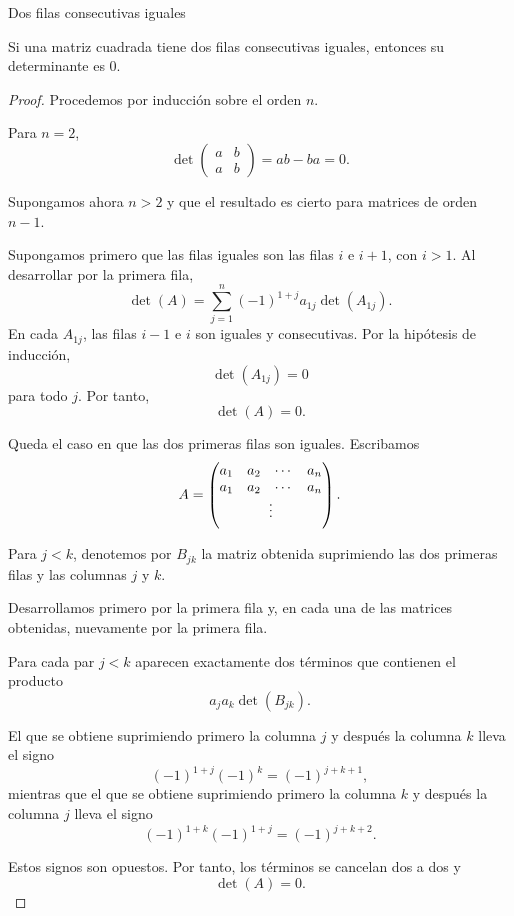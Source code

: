 \begin{frame}[allowframebreaks, t]{Dos filas consecutivas iguales}

\begin{proposition}
Si una matriz cuadrada tiene dos filas consecutivas iguales, entonces
su determinante es \(0\).
\end{proposition}

\begin{proof}
Procedemos por inducción sobre el orden \(n\).

Para \(n=2\),
\[
\det
\begin{pmatrix}
a&b\\
a&b
\end{pmatrix}
=ab-ba=0.
\]

Supongamos ahora \(n>2\) y que el resultado es cierto para matrices
de orden \(n-1\).

Supongamos primero que las filas iguales son las filas \(i\) e
\(i+1\), con \(i>1\). Al desarrollar por la primera fila,
\[
\det(A)
=
\sum_{j=1}^n
(-1)^{1+j}a_{1j}\det(A_{1j}).
\]
En cada \(A_{1j}\), las filas \(i-1\) e \(i\) son iguales y
consecutivas. Por la hipótesis de inducción,
\[
\det(A_{1j})=0
\]
para todo \(j\). Por tanto,
\[
\det(A)=0.
\]

Queda el caso en que las dos primeras filas son iguales. Escribamos
\[
A=
\begin{pmatrix}
a_1&a_2&\cdots&a_n\\
a_1&a_2&\cdots&a_n\\
\multicolumn{4}{c}{\raisebox{1ex}{\(\vdots\)}}
\end{pmatrix}.
\]

Para \(j<k\), denotemos por \(B_{jk}\) la matriz obtenida suprimiendo
las dos primeras filas y las columnas \(j\) y \(k\).

Desarrollamos primero por la primera fila y, en cada una de las
matrices obtenidas, nuevamente por la primera fila.

Para cada par \(j<k\) aparecen exactamente dos términos que contienen
el producto
\[
a_ja_k\det(B_{jk}).
\]

El que se obtiene suprimiendo primero la columna \(j\) y después la
columna \(k\) lleva el signo
\[
(-1)^{1+j}(-1)^k
=
(-1)^{j+k+1},
\]
mientras que el que se obtiene suprimiendo primero la columna \(k\)
y después la columna \(j\) lleva el signo
\[
(-1)^{1+k}(-1)^{1+j}
=
(-1)^{j+k+2}.
\]

Estos signos son opuestos. Por tanto, los términos se cancelan dos a
dos y
\[
\det(A)=0.
\]
\end{proof}

\end{frame}

